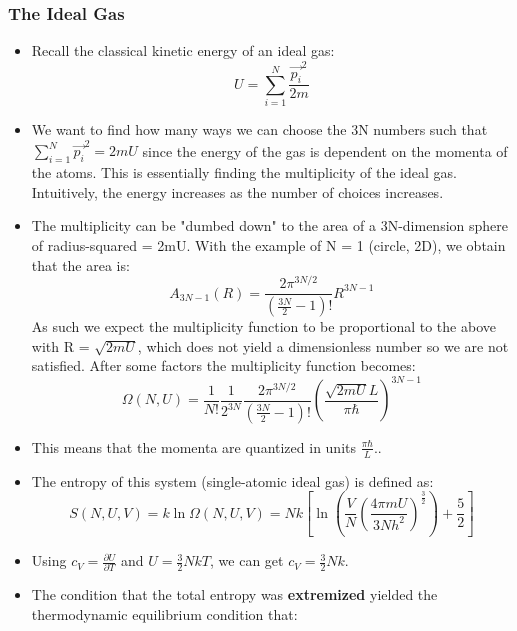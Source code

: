 \documentclass[12pt, letterpaper, twoside]{article}
\begin{document}
\subsubsection{The Ideal Gas}

\begin{itemize}
    \item Recall the classical kinetic energy of an ideal gas:
    \begin{equation*}
        U = \sum_{i=1}^N\frac{\vec{p_i}^2}{2m}
    \end{equation*}
    \item We want to find how many ways we can choose the 3N numbers such that $\sum_{i=1}^N\vec{p_i}^2 = 2mU$ since the energy of the gas is dependent on the momenta of the atoms. This is essentially finding the multiplicity of the ideal gas. Intuitively, the energy increases as the number of choices increases.
    \item The multiplicity can be "dumbed down" to the area of a 3N-dimension sphere of radius-squared = 2mU. With the example of N = 1 (circle, 2D), we obtain that the area is:
    \begin{equation*}
        A_{3N-1}(R) = \frac{2\pi^{3N/2}}{(\frac{3N}{2}-1)!}R^{3N-1}
    \end{equation*}
    As such we expect the multiplicity function to be proportional to the above with R = $\sqrt{2mU}$, which does not yield a dimensionless number so we are not satisfied. After some factors the multiplicity function becomes:
    \begin{equation}
        \Omega(N,U) = \frac{1}{N!}\frac{1}{2^{3N}}\frac{2\pi^{3N/2}}{(\frac{3N}{2}-1)!}(\frac{\sqrt{2mU}L}{\pi\hbar})^{3N-1}
    \end{equation}
    \item This means that the momenta are quantized in units $\frac{\pi\hbar}{L}$..
    \item The entropy of this system (single-atomic ideal gas) is defined as:
    \begin{equation*}
        S(N,U,V) = k\ln{\Omega(N,U,V)} = Nk[\ln{(\frac{V}{N}(\frac{4\pi mU}{3Nh^2})^{\frac{3}{2}})} + \frac{5}{2}]
    \end{equation*}
    \item Using $c_V = \frac{\partial U}{\partial T}$ and $U = \frac{3}{2}NkT$, we can get $c_V = \frac{3}{2}Nk$.
    \item The condition that the total entropy was \textbf{extremized} yielded the thermodynamic equilibrium condition that:
    \begin{equation*}

\end{equation*}
\end{itemize}
\end{document}
